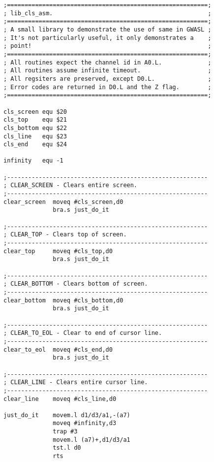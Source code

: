 \begin{lstlisting}[firstnumber=1,caption={Example Library - Lib\_cls\_asm},label={lst:LibClsAsm}]
;=========================================================;
; lib_cls_asm.                                            ;
;=========================================================;
; A small library to demonstrate the use of same in GWASL ;
; It's not particularly useful, it only demonstrates a    ;
; point!                                                  ;
;=========================================================;
; All routines expect the channel id in A0.L.             ;
; All routines assume infinite timeout.                   ;
; All regsiters are preserved, except D0.L.               ;
; Error codes are returned in D0.L and the Z flag.        ;
;=========================================================;

cls_screen equ $20
cls_top    equ $21
cls_bottom equ $22
cls_line   equ $23
cls_end    equ $24

infinity   equ -1

;---------------------------------------------------------
; CLEAR_SCREEN - Clears entire screen.                    
;---------------------------------------------------------
clear_screen  moveq #cls_screen,d0
              bra.s just_do_it

;---------------------------------------------------------
; CLEAR_TOP - Clears top of screen.                       
;---------------------------------------------------------
clear_top     moveq #cls_top,d0
              bra.s just_do_it

;---------------------------------------------------------
; CLEAR_BOTTOM - Clears bottom of screen.                 
;---------------------------------------------------------
clear_bottom  moveq #cls_bottom,d0
              bra.s just_do_it

;---------------------------------------------------------
; CLEAR_TO_EOL - Clear to end of cursor line.             
;---------------------------------------------------------
clear_to_eol  moveq #cls_end,d0
              bra.s just_do_it

;---------------------------------------------------------
; CLEAR_LINE - Clears entire cursor line.                 
;---------------------------------------------------------
clear_line    moveq #cls_line,d0

just_do_it    movem.l d1/d3/a1,-(a7)
              moveq #infinity,d3
              trap #3
              movem.l (a7)+,d1/d3/a1
              tst.l d0
              rts
\end{lstlisting}

